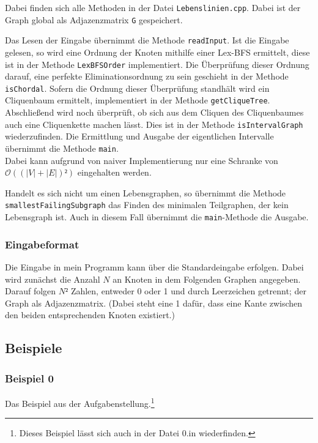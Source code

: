 Dabei finden sich alle Methoden in der Datei \texttt{Lebenslinien.cpp}. Dabei ist der Graph global als Adjazenzmatrix \texttt{G} gespeichert.

Das Lesen der Eingabe übernimmt die Methode \texttt{readInput}. Ist die Eingabe gelesen, so wird eine Ordnung der Knoten mithilfe einer Lex-BFS ermittelt, diese ist in der Methode \texttt{LexBFSOrder} implementiert. Die Überprüfung dieser Ordnung darauf, eine perfekte Eliminationsordnung zu sein geschieht in der Methode \texttt{isChordal}. Sofern die Ordnung dieser Überprüfung standhält wird ein Cliquenbaum ermittelt, implementiert in der Methode \texttt{getCliqueTree}. Abschließend wird noch überprüft, ob sich aus dem Cliquen des Cliquenbaumes auch eine Cliquenkette machen lässt. Dies ist in der Methode \texttt{isIntervalGraph} wiederzufinden. Die Ermittlung und Ausgabe der eigentlichen Intervalle übernimmt die Methode \texttt{main}.\\
Dabei kann aufgrund von naiver Implementierung nur eine Schranke von $\mathcal{O}((|V| + |E|)²)$ eingehalten werden.

Handelt es sich nicht um einen Lebensgraphen, so übernimmt die Methode \texttt{smallestFailingSubgraph} das Finden des minimalen Teilgraphen, der kein Lebensgraph ist. Auch in diesem Fall übernimmt die \texttt{main}-Methode die Ausgabe.

\subsubsection{Eingabeformat}

Die Eingabe in mein Programm kann über die Standardeingabe erfolgen. Dabei wird zunächst die Anzahl $N$ an Knoten in dem Folgenden Graphen angegeben. Darauf folgen $N²$ Zahlen, entweder 0 oder 1 und durch Leerzeichen getrennt; der Graph als Adjazenzmatrix. (Dabei steht eine 1 dafür, dass eine Kante zwischen den beiden entsprechenden Knoten existiert.)

 
\subsection{Beispiele}
\subsubsection*{Beispiel 0}
Das Beispiel aus der Aufgabenstellung.\footnote{Dieses Beispiel lässt sich auch in der Datei 0.in wiederfinden.}

